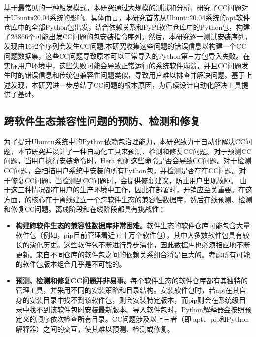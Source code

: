 基于最常见的一种触发模式，本研究通过大规模的测试和分析，研究了CC问题对于Ubuntu20.04系统的影响。具体而言，本研究首先从Ubuntu20.04系统的apt软件仓库中的全部Python包出发，结合依赖关系和PyPI软件仓库中的Python包，构建了23866个可能出发CC问题的包安装指令序列。然后，本研究逐一测试安装序列，发现由1692个序列会发生CC问题.本研究收集这些问题的错误信息以构建一个CC问题数据集，这些CC问题导致原本可以正常导入的Python第三方包导入失败。在实际用户环境中，这些失败可能会导致正常运行的系统软件崩溃，并且CC问题发生时的错误信息和传统包兼容性问题类似，导致用户难以排查并解决问题。基于上述发现，本研究进一步总结了CC问题的根本原因，为后续设计自动化解决工具提供了基础。
\subsection{跨软件生态兼容性问题的预防、检测和修复}
为了提升Ubuntu系统中的Python依赖包治理能力，本研究致力于自动化解决CC问题，本节研究并设计了一种自动化工具\tool{}来预测、检测和修复CC问题。对于预测CC问题，当用户执行安装命令时，Hera
预测这些命令是否会导致CC问题。对于检测CC问题，\tool{}会扫描用户系统中安装的所有Python包，并检测是否存在CC问题。对于修复CC问题，当检测到CC问题时，\tool{}会提供修复建议，防止用户出现故障。
由于这三种情况都在用户的生产环境中工作，因此在部署\tool{}时，开销应至关重要。在这方面，\tool{}的核心在于离线建立一个跨软件生态的兼容性数据库，然后在线预测、检测和修复CC问题。离线阶段和在线阶段都具有挑战性：
\begin{itemize}
	\item \textbf{构建跨软件生态的兼容性数据库非常困难。}软件生态的软件仓库可能包含大量软件包（例如，pip目前管理着近五十万个软件包），其中大多数软件包具有较长的演化历史。这些软件包不断进行异步演化，因此数据库也必须相应地不断更新。来自不同仓库的软件包之间的依赖关系组合将是巨大的。考虑所有可能的软件包版本组合几乎是不可能的。
	\item\textbf{ 预测、检测和修复CC问题并非易事。}每个软件生态的软件仓库都有其独特的管理工具，并采用不同的安装策略和目录结构。安装软件包时，若apt在其自身的安装目录中找不到该软件包，则会安装特定版本，而pip则会在系统级目录中找不到该软件包时安装最新版本。导入软件包时，Python解释器会按照预定义的顺序依次检查所有目录。CC问题涉及以上三者（即 apt、pip和Python解释器）之间的交互，使其难以预测、检测或修复。
\end{itemize}

